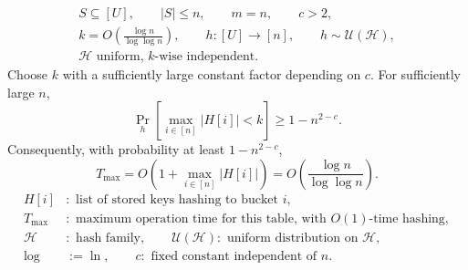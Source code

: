 \documentclass[12pt,a4paper]{article}
\begin{document}
\begin{theorem}
\label{thm:chaining-worst-case}
\[
\begin{gathered}
S\subseteq[U],\qquad |S|\leq n,\qquad m=n,\qquad c>2,\\
k=O\!\left(\frac{\log n}{\log\log n}\right),\qquad
h:[U]\to[n],\qquad h\sim\mathcal U(\mathcal H),\\
\mathcal H\text{ uniform, }k\text{-wise independent}.
\end{gathered}
\]
Choose $k$ with a sufficiently large constant factor depending on $c$.
For sufficiently large $n$,
\[
\Pr_h\!\left[\max_{i\in[n]}|H[i]|<k\right]\geq1-n^{2-c}.
\]
Consequently, with probability at least $1-n^{2-c}$,
\[
T_{\max}=O\!\left(1+\max_{i\in[n]}|H[i]|\right)
=O\!\left(\frac{\log n}{\log\log n}\right).
\]
\[
\begin{aligned}
H[i]&:\text{ list of stored keys hashing to bucket }i,\\
T_{\max}&:\text{ maximum operation time for this table, with }O(1)\text{-time hashing},\\
\mathcal H&:\text{ hash family},\qquad
\mathcal U(\mathcal H):\text{ uniform distribution on }\mathcal H,\\
\log&:=\ln,\qquad c:\text{ fixed constant independent of }n.
\end{aligned}
\]
\end{theorem}
\end{document}
